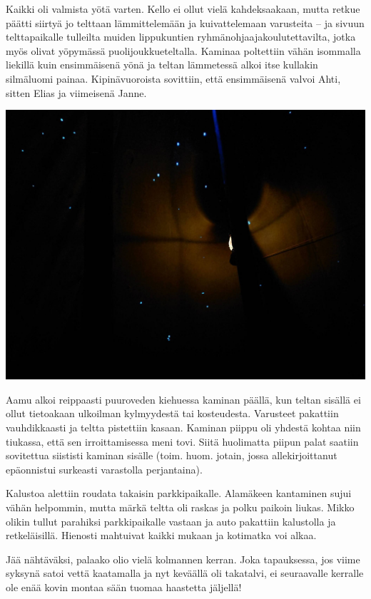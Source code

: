 \begin{multicols}{2}
	Kaikki oli valmista yötä varten. Kello ei ollut vielä kahdeksaakaan,
	mutta retkue päätti siirtyä jo telttaan lämmittelemään ja
	kuivattelemaan varusteita -- ja sivuun telttapaikalle tulleilta muiden
	lippukuntien ryhmänohjaajakoulutettavilta, jotka myös olivat yöpymässä
	puolijoukkueteltalla. Kaminaa poltettiin vähän isommalla liekillä kuin
	ensimmäisenä yönä ja teltan lämmetessä alkoi itse kullakin silmäluomi
	painaa. Kipinävuoroista sovittiin, että ensimmäisenä valvoi Ahti,
	sitten Elias ja viimeisenä Janne. 

	\vspace*{0.08cm}
	\noindent\includegraphics[width=\linewidth]{assets/olionpaluu1}

	Aamu alkoi reippaasti puuroveden kiehuessa kaminan päällä, kun teltan
	sisällä ei ollut tietoakaan ulkoilman kylmyydestä tai kosteudesta.
	Varusteet pakattiin vauhdikkaasti ja teltta pistettiin kasaan. Kaminan
	piippu oli yhdestä kohtaa niin tiukassa, että sen irroittamisessa meni
	tovi. Siitä huolimatta piipun palat saatiin sovitettua siististi
	kaminan sisälle (toim. huom. jotain, jossa allekirjoittanut epäonnistui
	surkeasti varastolla perjantaina).

	Kalustoa alettiin roudata takaisin parkkipaikalle. Alamäkeen kantaminen
	sujui vähän helpommin, mutta märkä teltta oli raskas ja polku paikoin
	liukas. Mikko olikin tullut parahiksi parkkipaikalle vastaan ja auto
	pakattiin kalustolla ja retkeläisillä. Hienosti mahtuivat kaikki mukaan
	ja kotimatka voi alkaa.

	Jää nähtäväksi, palaako olio vielä kolmannen kerran. Joka tapauksessa,
	jos viime syksynä satoi vettä kaatamalla ja nyt keväällä oli takatalvi,
	ei seuraavalle kerralle ole enää kovin montaa sään tuomaa haastetta
	jäljellä!

\end{multicols}

